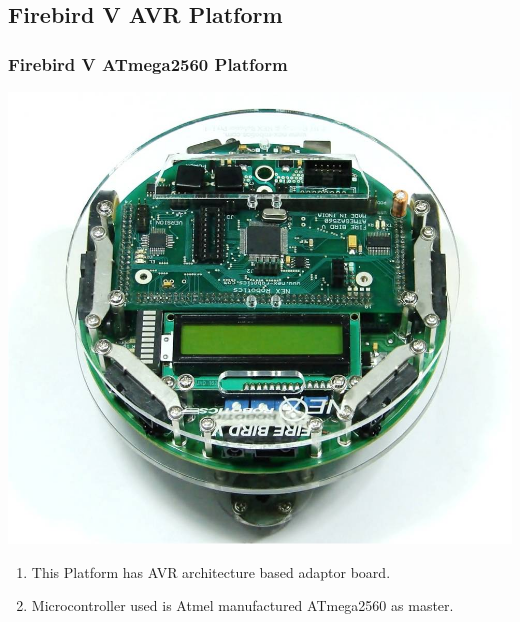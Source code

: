 \documentclass[10pt,red]{beamer}
\begin{document}
\subsection{Firebird V AVR Platform}
\begin{frame}
	\frametitle{Firebird V ATmega2560 Platform} \pause
		\begin{minipage}[c]{0.4\textwidth}
			\includegraphics[width=\linewidth]{fb_v_avr}
		\end{minipage}
	\pause
	\hfill
		\begin{minipage}[c]{0.5\textwidth}
			\begin{enumerate}
				\item <+-|alert@+> This Platform has AVR architecture based adaptor board.
				\item <+-|alert@+> Microcontroller used is Atmel manufactured ATmega2560 as master.
			\end{enumerate}
		\end{minipage}   
\end{frame}


\end{document}
